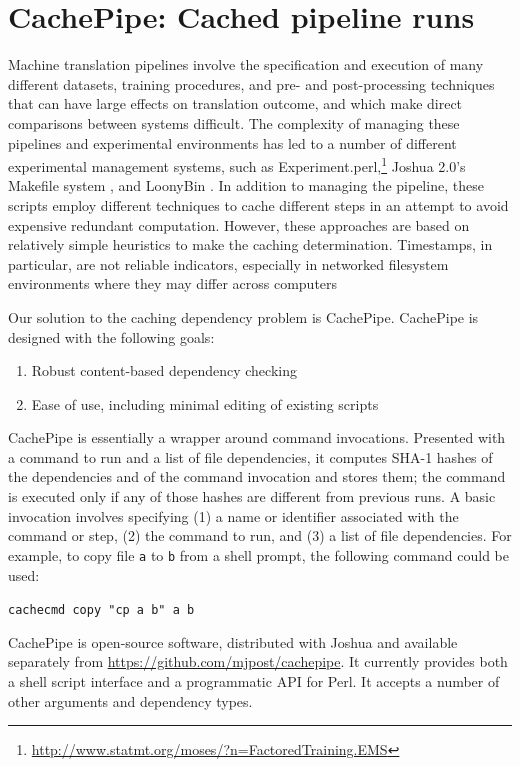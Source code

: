 \documentclass[11pt]{article}
\begin{document}
\section{CachePipe: Cached pipeline runs}

Machine translation pipelines involve the specification and execution
of many different datasets, training procedures, and pre- and
post-processing techniques that can have large effects on translation
outcome, and which make direct comparisons between systems difficult.
The complexity of managing these pipelines and experimental
environments has led to a number of different experimental management
systems, such as
Experiment.perl,\footnote{\url{http://www.statmt.org/moses/?n=FactoredTraining.EMS}}
Joshua 2.0's Makefile system \cite{li2010joshua}, and LoonyBin
\cite{clark2010loonybin}.  In addition to managing the pipeline, these
scripts employ different techniques to cache different steps in an
attempt to avoid expensive redundant computation.  However, these
approaches are based on relatively simple heuristics to make the
caching determination.  Timestamps, in particular, are not reliable
indicators, especially in networked filesystem environments where
they may differ across computers

Our solution to the caching dependency problem is CachePipe.
CachePipe is designed with the following goals:

\begin{enumerate}
\item Robust content-based dependency checking
\item Ease of use, including minimal editing of existing scripts
\end{enumerate}

\noindent CachePipe is essentially a wrapper around command
invocations.  Presented with a command to run
and a list of file dependencies, it computes SHA-1 hashes of the
dependencies and of the command invocation and stores them; the
command is executed only if any of those hashes are different from
previous runs.  A
basic invocation involves specifying (1) a name or identifier
associated with the command or step, (2) the command to run, and (3) a
list of file dependencies.  For example, to copy file \verb|a| to
\verb|b| from a shell prompt, the following command could be used:

\verb|cachecmd copy "cp a b" a b|

\noindent CachePipe is open-source software, distributed with Joshua
and available separately from
\url{https://github.com/mjpost/cachepipe}.  It currently provides both
a shell script interface and a programmatic API for Perl.  It accepts
a number of other arguments and dependency types.
\end{document}
